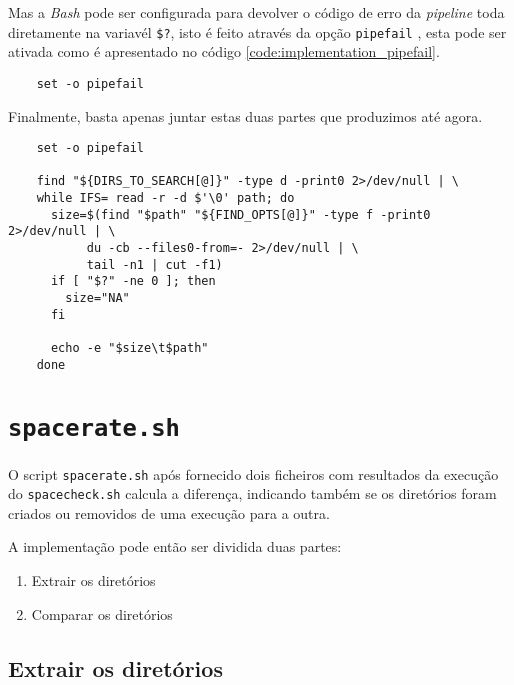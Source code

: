 Mas a \emph{Bash} pode ser configurada para devolver o código de erro da
\emph{pipeline} toda diretamente na variavél \Verb|$?|, isto é feito através da
opção \Verb|pipefail| \cite{bash_man}, esta pode ser ativada como é apresentado
no código \ref{code:implementation_pipefail}.

\begin{listing}[H]
	\centering
	\begin{verbatim}
    set -o pipefail
  \end{verbatim}
	\cprotect\caption{Ativação da opção \Verb|pipefail|}
	\label{code:implementation_pipefail}
\end{listing}

Finalmente, basta apenas juntar estas duas partes que produzimos até agora.

\begin{listing}[H]
	\centering
	\begin{verbatim}
    set -o pipefail

    find "${DIRS_TO_SEARCH[@]}" -type d -print0 2>/dev/null | \
    while IFS= read -r -d $'\0' path; do
      size=$(find "$path" "${FIND_OPTS[@]}" -type f -print0  2>/dev/null | \
           du -cb --files0-from=- 2>/dev/null | \
           tail -n1 | cut -f1)
      if [ "$?" -ne 0 ]; then
        size="NA"
      fi

      echo -e "$size\t$path"
    done
  \end{verbatim}
	\cprotect\caption{Implementação do algoritmo principal do \Verb|spacecheck.sh|}
\end{listing}

\cprotect\section{\Verb|spacerate.sh|}

O script \Verb|spacerate.sh| após fornecido dois ficheiros com resultados da
execução do \Verb|spacecheck.sh| calcula a diferença, indicando também se os
diretórios foram criados ou removidos de uma execução para a outra.

A implementação pode então ser dividida duas partes:

\begin{enumerate}
	\item Extrair os diretórios
	\item Comparar os diretórios
\end{enumerate}

\subsection{Extrair os diretórios}

